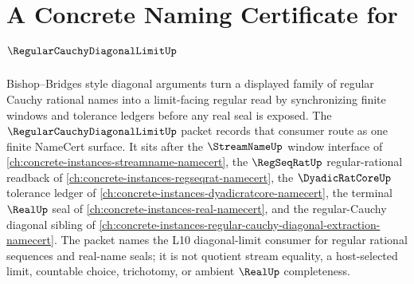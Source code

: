 \chapter{A Concrete Naming Certificate for $\RegularCauchyDiagonalLimitUp$}
\label{ch:concrete-instances-regular-cauchy-diagonal-limit-namecert}

Bishop--Bridges style diagonal arguments turn a displayed family of regular Cauchy rational names into a limit-facing regular read by synchronizing finite windows and tolerance ledgers before any real seal is exposed. The $\RegularCauchyDiagonalLimitUp$ packet records that consumer route as one finite NameCert surface. It sits after the $\StreamNameUp$ window interface of \autoref{ch:concrete-instances-streamname-namecert}, the $\RegSeqRatUp$ regular-rational readback of \autoref{ch:concrete-instances-regseqrat-namecert}, the $\DyadicRatCoreUp$ tolerance ledger of \autoref{ch:concrete-instances-dyadicratcore-namecert}, the terminal $\RealUp$ seal of \autoref{ch:concrete-instances-real-namecert}, and the regular-Cauchy diagonal sibling of \autoref{ch:concrete-instances-regular-cauchy-diagonal-extraction-namecert}. The packet names the L10 diagonal-limit consumer for regular rational sequences and real-name seals; it is not quotient stream equality, a host-selected limit, countable choice, trichotomy, or ambient $\RealUp$ completeness.

